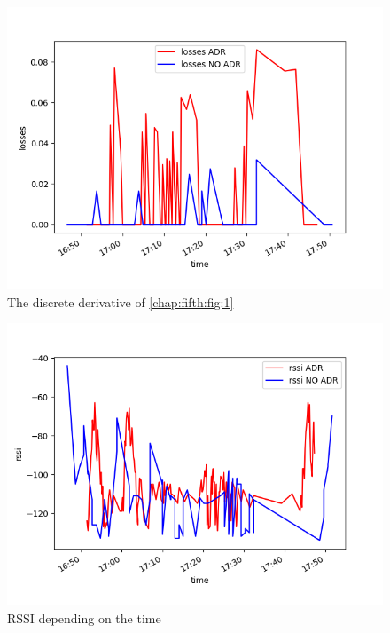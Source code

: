 \begin{figure}[htbp]
    \includegraphics[width=\linewidth]{lossesderivadas.png}
    \caption{The discrete derivative of \ref{chap:fifth:fig:1}}
    \label{chap:fifth:fig:3:noADR}
\end{figure}

\begin{figure}[htbp]
    \includegraphics[width=\linewidth]{RSSI.png}
    \caption{RSSI depending on the time}
    \label{chap:fifth:fig:2}
\end{figure}



